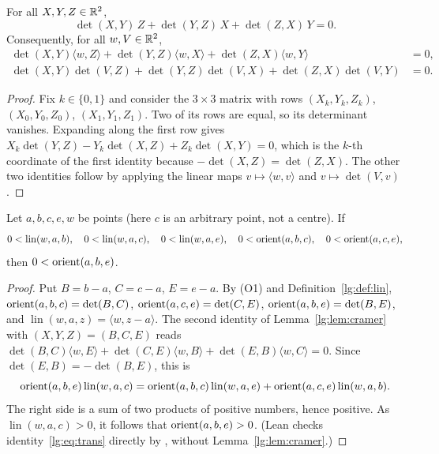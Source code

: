 \begin{lemma}\label{lg:lem:cramer}
For all $X,Y,Z\in\mathbb R^2$,
\[
  \det(X,Y)\,Z+\det(Y,Z)\,X+\det(Z,X)\,Y=0 .
\]
Consequently, for all $w,V\in\mathbb R^2$,
\begin{align*}
  \det(X,Y)\langle w,Z\rangle+\det(Y,Z)\langle w,X\rangle+\det(Z,X)\langle w,Y\rangle&=0,\\
  \det(X,Y)\det(V,Z)+\det(Y,Z)\det(V,X)+\det(Z,X)\det(V,Y)&=0.
\end{align*}
\end{lemma}

\begin{proof}
Fix $k\in\{0,1\}$ and consider the $3\times3$ matrix with rows $(X_k,Y_k,Z_k)$, $(X_0,Y_0,Z_0)$, $(X_1,Y_1,Z_1)$. Two of
its rows are equal, so its determinant vanishes. Expanding along the first row gives
$X_k\det(Y,Z)-Y_k\det(X,Z)+Z_k\det(X,Y)=0$, which is the $k$-th coordinate of the first identity because
$-\det(X,Z)=\det(Z,X)$. The other two identities follow by applying the linear maps $v\mapsto\langle w,v\rangle$ and
$v\mapsto\det(V,v)$.
\end{proof}

\begin{lemma}\label{lg:lem:trans}
Let $a,b,c,e,w$ be points (here $c$ is an arbitrary point, not a centre). If
\[
  0<\operatorname{lin}(w,a,b),\quad 0<\operatorname{lin}(w,a,c),\quad 0<\operatorname{lin}(w,a,e),\quad
  0<\operatorname{orient}(a,b,c),\quad 0<\operatorname{orient}(a,c,e),
\]
then $0<\operatorname{orient}(a,b,e)$.
\end{lemma}

\begin{proof}
Put $B=b-a$, $C=c-a$, $E=e-a$. By (O1) and Definition~\ref{lg:def:lin}, $\operatorname{orient}(a,b,c)=\det(B,C)$,
$\operatorname{orient}(a,c,e)=\det(C,E)$, $\operatorname{orient}(a,b,e)=\det(B,E)$, and $\operatorname{lin}(w,a,z)=\langle w,z-a\rangle$. The
second identity of Lemma~\ref{lg:lem:cramer} with $(X,Y,Z)=(B,C,E)$ reads
$\det(B,C)\langle w,E\rangle+\det(C,E)\langle w,B\rangle+\det(E,B)\langle w,C\rangle=0$. Since $\det(E,B)=-\det(B,E)$,
this is
\begin{equation}\label{lg:eq:trans}
  \operatorname{orient}(a,b,e)\operatorname{lin}(w,a,c)=\operatorname{orient}(a,b,c)\operatorname{lin}(w,a,e)+\operatorname{orient}(a,c,e)\operatorname{lin}(w,a,b).
\end{equation}
The right side is a sum of two products of positive numbers, hence positive. As $\operatorname{lin}(w,a,c)>0$, it
follows that $\operatorname{orient}(a,b,e)>0$. (Lean checks identity~\eqref{lg:eq:trans} directly by , without
Lemma~\ref{lg:lem:cramer}.)
\end{proof}

